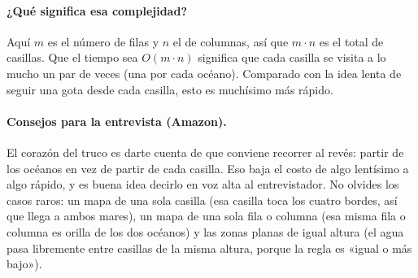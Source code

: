 


\paragraph{¿Qué significa esa complejidad?} Aquí $m$ es el número de filas y
$n$ el de columnas, así que $m\cdot n$ es el total de casillas. Que el tiempo
sea $O(m\cdot n)$ significa que cada casilla se visita a lo mucho un par de
veces (una por cada océano). Comparado con la idea lenta de seguir una gota
desde cada casilla, esto es muchísimo más rápido.

\paragraph{Consejos para la entrevista (Amazon).} El corazón del truco es darte
cuenta de que conviene recorrer al revés: partir de los océanos en vez de
partir de cada casilla. Eso baja el costo de algo lentísimo a algo rápido, y es
buena idea decirlo en voz alta al entrevistador. No olvides los casos raros: un
mapa de una sola casilla (esa casilla toca los cuatro bordes, así que llega a
ambos mares), un mapa de una sola fila o columna (esa misma fila o columna es
orilla de los dos océanos) y las zonas planas de igual altura (el agua pasa
libremente entre casillas de la misma altura, porque la regla es «igual o más
bajo»).
